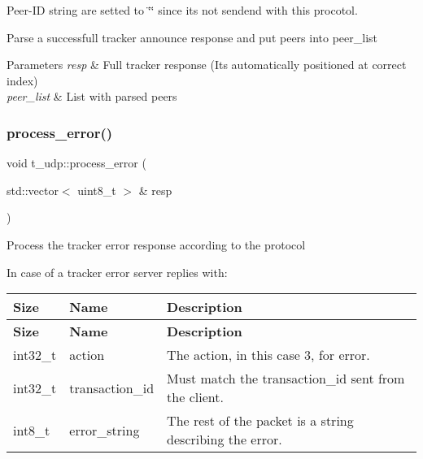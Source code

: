 Peer-\/\+ID string are setted to \char`\"{}\char`\"{} since it\textquotesingle{}s not sendend with this procotol. 

Parse a successfull tracker announce response and put peers into peer\+\_\+list


\begin{DoxyParams}{Parameters}
{\em resp} & Full tracker response (It\textquotesingle{}s automatically positioned at correct index) \\
\hline
{\em peer\+\_\+list} & List with parsed peers \\
\hline
\end{DoxyParams}
\mbox{\label{namespacet__udp_aab582ebbfac6fd929e811527e44384c1}} 
\subsubsection{\texorpdfstring{process\+\_\+error()}{process\_error()}}
{\footnotesize\ttfamily void t\+\_\+udp\+::process\+\_\+error (\begin{DoxyParamCaption}\item[{std\+::vector$<$ uint8\+\_\+t $>$ \&}]{resp }\end{DoxyParamCaption})}

Process the tracker error response according to the protocol

In case of a tracker error server replies with\+:

\tabulinesep=1mm
\begin{longtabu} spread 0pt [c]{*{3}{|X[-1]}|}
\hline
\rowcolor{\tableheadbgcolor}\textbf{ Size }&\textbf{ Name }&\textbf{ Description  }\\
\endfirsthead
\hline
\endfoot
\hline
\rowcolor{\tableheadbgcolor}\textbf{ Size }&\textbf{ Name }&\textbf{ Description  }\\
\endhead
int32\+\_\+t &action &The action, in this case 3, for error. \\
int32\+\_\+t &transaction\+\_\+id &Must match the transaction\+\_\+id sent from the client. \\
int8\+\_\+t &error\+\_\+string &The rest of the packet is a string describing the error. \\
\end{longtabu}



